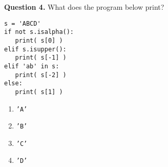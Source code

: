 \documentclass[12pt]{article}
\begin{document}
{\bf Question 4.}  What does the program below print?
\begin{lstlisting}[frame=single]
s = 'ABCD'
if not s.isalpha():
   print( s[0] )
elif s.isupper():
   print( s[-1] )
elif 'ab' in s:
   print( s[-2] )
else:
   print( s[1] )
\end{lstlisting}
\vspace{-0.5cm}
\begin{enumerate}[label=\Alph*]
	\item  \texttt{'A'} 
	\item  \texttt{'B'} 
	\item  \texttt{'C'} 
	\item  \texttt{'D'}%
\end{enumerate}
\end{document}
